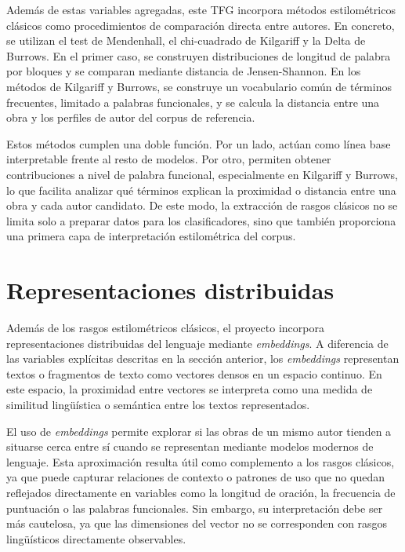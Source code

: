 \documentclass[IB]{TFUOC}%
\begin{document}
Además de estas variables agregadas, este TFG incorpora métodos estilométricos clásicos como procedimientos de comparación directa entre autores. En concreto, se utilizan el test de Mendenhall, el chi-cuadrado de Kilgariff y la Delta de Burrows. En el primer caso, se construyen distribuciones de longitud de palabra por bloques y se comparan mediante distancia de Jensen-Shannon. En los métodos de Kilgariff y Burrows, se construye un vocabulario común de términos frecuentes, limitado a palabras funcionales, y se calcula la distancia entre una obra y los perfiles de autor del corpus de referencia.

Estos métodos cumplen una doble función. Por un lado, actúan como línea base interpretable frente al resto de modelos. Por otro, permiten obtener contribuciones a nivel de palabra funcional, especialmente en Kilgariff y Burrows, lo que facilita analizar qué términos explican la proximidad o distancia entre una obra y cada autor candidato. De este modo, la extracción de rasgos clásicos no se limita solo a preparar datos para los clasificadores, sino que también proporciona una primera capa de interpretación estilométrica del corpus.

\section{Representaciones distribuidas}

Además de los rasgos estilométricos clásicos, el proyecto incorpora representaciones distribuidas del lenguaje mediante \textit{embeddings}. A diferencia de las variables explícitas descritas en la sección anterior, los \textit{embeddings} representan textos o fragmentos de texto como vectores densos en un espacio continuo. En este espacio, la proximidad entre vectores se interpreta como una medida de similitud lingüística o semántica entre los textos representados.

El uso de \textit{embeddings} permite explorar si las obras de un mismo autor tienden a situarse cerca entre sí cuando se representan mediante modelos modernos de lenguaje. Esta aproximación resulta útil como complemento a los rasgos clásicos, ya que puede capturar relaciones de contexto o patrones de uso que no quedan reflejados directamente en variables como la longitud de oración, la frecuencia de puntuación o las palabras funcionales. Sin embargo, su interpretación debe ser más cautelosa, ya que las dimensiones del vector no se corresponden con rasgos lingüísticos directamente observables.
\end{document}
